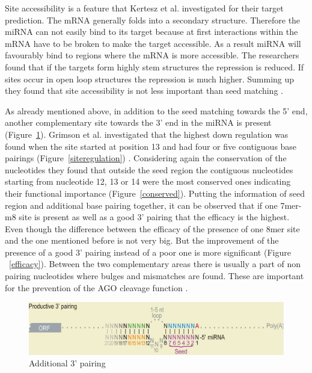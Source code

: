 \documentclass[12pt]{article}
\begin{document}
Site accessibility is a feature that Kertesz et al. investigated for their target prediction. The mRNA generally folds into a secondary structure. Therefore the miRNA can not easily bind to its target because at first interactions within the mRNA have to be broken to make the target accessible. As a result miRNA will favourably bind to regions where the mRNA is more accessible. The researchers found that if the targets form highly stem structures the repression is reduced. If sites occur in open loop structures the repression is much higher. Summing up they found that site accessibility is not less important than seed matching \cite{Kertesz}. 

As already mentioned above, in addition to the seed matching towards the 5' end, another complementary site towards the 3' end in the miRNA is present (Figure~\ref{addipairing}). Grimson et al. investigated that the highest down regulation was found when the site started at position 13 and had four or five contiguous base pairings (Figure~\ref{siteregulation}) \cite{Grimson}. Considering again the conservation of the nucleotides they found that outside the seed region the contiguous nucleotides starting from nucleotide 12, 13 or 14 were the most conserved ones indicating their functional importance (Figure~\ref{conserved}). Putting the information of seed region and additional base pairing together, it can be observed that if one 7mer-m8 site is present as well as a good 3' pairing that the efficacy is the highest. Even though the difference between the efficacy of the presence of one 8mer site and the one mentioned before is not very big. But the improvement of the presence of a good 3' pairing instead of a poor one is more significant (Figure ~\ref{efficacy}).
Between the two complementary areas there is usually a part of non pairing nucleotides where bulges and mismatches are found. These are important for the prevention of the AGO cleavage function \cite{Filipowicz}.

\begin{figure}[h]
\centering
\includegraphics[scale=0.3]{results/additional_pairing.PNG}
\caption{Additional 3' pairing}
\label{addipairing}
\end{figure}
\end{document}
